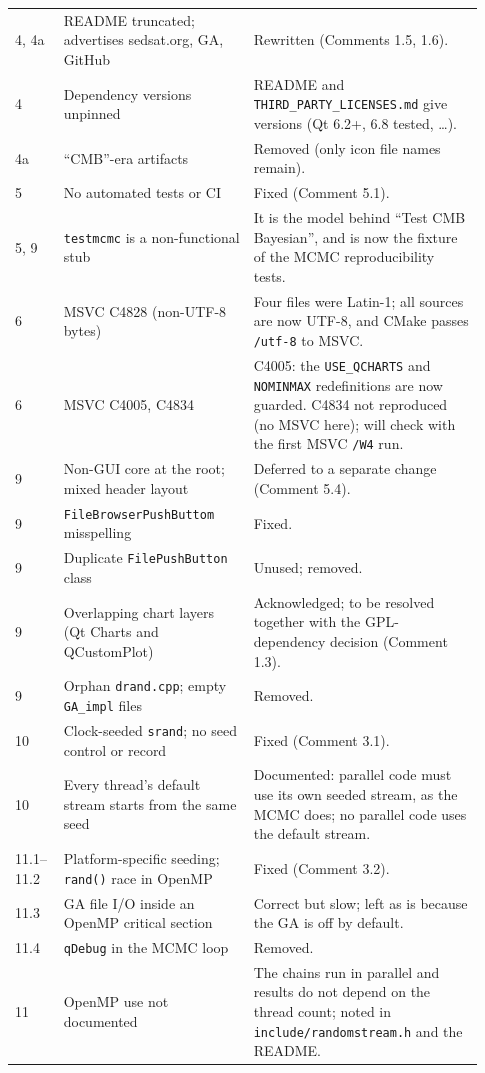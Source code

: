 \documentclass[11pt]{article}
\newcommand{\code}[1]{\texttt{#1}}
\begin{document}
{\begin{longtable}{@{}p{0.09\linewidth}p{0.38\linewidth}p{0.46\linewidth}@{}}
4, 4a & README truncated; advertises sedsat.org, GA, GitHub & Rewritten (Comments 1.5, 1.6).\\
4 & Dependency versions unpinned & README and \code{THIRD\_\allowbreak{}PARTY\_\allowbreak{}LICENSES.\allowbreak{}md} give versions (Qt 6.2+, 6.8 tested, \ldots).\\
4a & ``CMB''-era artifacts & Removed (only icon file names remain).\\
5 & No automated tests or CI & Fixed (Comment 5.1).\\
5, 9 & \code{testmcmc} is a non-functional stub & It is the model behind ``Test CMB Bayesian'', and is now the fixture of the MCMC reproducibility tests.\\
6 & MSVC C4828 (non-UTF-8 bytes) & Four files were Latin-1; all sources are now UTF-8, and CMake passes \code{/\allowbreak{}utf-8} to MSVC.\\
6 & MSVC C4005, C4834 & C4005: the \code{USE\_\allowbreak{}QCHARTS} and \code{NOMINMAX} redefinitions are now guarded. C4834 not reproduced (no MSVC here); will check with the first MSVC \code{/\allowbreak{}W4} run.\\
9 & Non-GUI core at the root; mixed header layout & Deferred to a separate change (Comment 5.4).\\
9 & \code{FileBrowserPushButtom} misspelling & Fixed.\\
9 & Duplicate \code{FilePushButton} class & Unused; removed.\\
9 & Overlapping chart layers (Qt Charts and QCustomPlot) & Acknowledged; to be resolved together with the GPL-dependency decision (Comment 1.3).\\
9 & Orphan \code{drand.\allowbreak{}cpp}; empty \code{GA\_\allowbreak{}impl} files & Removed.\\
10 & Clock-seeded \code{srand}; no seed control or record & Fixed (Comment 3.1).\\
10 & Every thread's default stream starts from the same seed & Documented: parallel code must use its own seeded stream, as the MCMC does; no parallel code uses the default stream.\\
11.1--11.2 & Platform-specific seeding; \code{rand()} race in OpenMP & Fixed (Comment 3.2).\\
11.3 & GA file I/O inside an OpenMP critical section & Correct but slow; left as is because the GA is off by default.\\
11.4 & \code{qDebug} in the MCMC loop & Removed.\\
11 & OpenMP use not documented & The chains run in parallel and results do not depend on the thread count; noted in \code{include/\allowbreak{}randomstream.\allowbreak{}h} and the README.\\

\end{longtable}}
\end{document}
